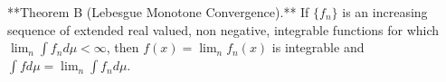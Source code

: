 **Theorem B (Lebesgue Monotone Convergence).** If $\{f_n\}$ is an increasing sequence of extended real valued, non negative, integrable functions for which $\lim_n \int f_n d\mu < \infty$, then $f(x) = \lim_n f_n(x)$ is integrable and $\int f d\mu = \lim_n \int f_n d\mu$.
